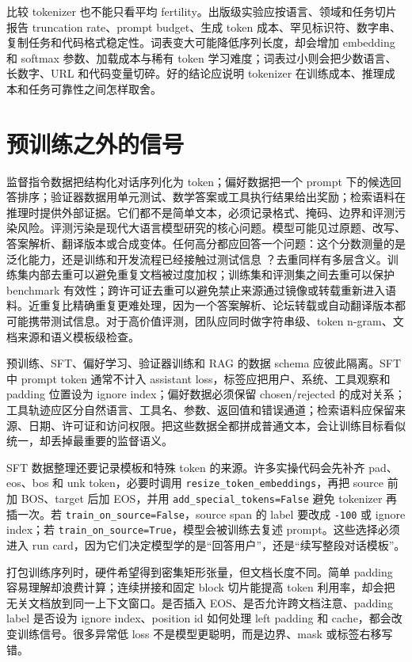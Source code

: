 \documentclass[UTF8,zihao=-4,openany]{ctexbook}
\begin{document}
比较 tokenizer 也不能只看平均 fertility。出版级实验应按语言、领域和任务切片报告 truncation rate、prompt budget、生成 token 成本、罕见标识符、数字串、复制任务和代码格式稳定性。词表变大可能降低序列长度，却会增加 embedding 和 softmax 参数、加载成本与稀有 token 学习难度；词表过小则会把少数语言、长数字、URL 和代码变量切碎。好的结论应说明 tokenizer 在训练成本、推理成本和任务可靠性之间怎样取舍。

\section{预训练之外的信号}
监督指令数据把结构化对话序列化为 token；偏好数据把一个 prompt 下的候选回答排序；验证器数据用单元测试、数学答案或工具执行结果给出奖励；检索语料在推理时提供外部证据。它们都不是简单文本，必须记录格式、掩码、边界和评测污染风险。评测污染是现代大语言模型研究的核心问题。模型可能见过原题、改写、答案解析、翻译版本或合成变体。任何高分都应回答一个问题：这个分数测量的是泛化能力，还是训练和开发流程已经接触过测试信息 \cite{xu2024benchmark}？去重同样有多层含义。训练集内部去重可以避免重复文档被过度加权；训练集和评测集之间去重可以保护 benchmark 有效性；跨许可证去重可以避免禁止来源通过镜像或转载重新进入语料。近重复比精确重复更难处理，因为一个答案解析、论坛转载或自动翻译版本都可能携带测试信息。对于高价值评测，团队应同时做字符串级、token n-gram、文档来源和语义模板级检查。

预训练、SFT、偏好学习、验证器训练和 RAG 的数据 schema 应彼此隔离。SFT 中 prompt token 通常不计入 assistant loss，标签应把用户、系统、工具观察和 padding 位置设为 ignore index；偏好数据必须保留 chosen/rejected 的成对关系；工具轨迹应区分自然语言、工具名、参数、返回值和错误通道；检索语料应保留来源、日期、许可证和访问权限。把这些数据全都拼成普通文本，会让训练目标看似统一，却丢掉最重要的监督语义。

SFT 数据整理还要记录模板和特殊 token 的来源。许多实操代码会先补齐 pad、eos、bos 和 unk token，必要时调用 \texttt{resize\_token\_embeddings}，再把 source 前加 BOS、target 后加 EOS，并用 \texttt{add\_special\_tokens=False} 避免 tokenizer 再插一次。若 \texttt{train\_on\_source=False}，source span 的 label 要改成 \texttt{-100} 或 ignore index；若 \texttt{train\_on\_source=True}，模型会被训练去复述 prompt。这些选择必须进入 run card，因为它们决定模型学的是“回答用户”，还是“续写整段对话模板”。

打包训练序列时，硬件希望得到密集矩形张量，但文档长度不同。简单 padding 容易理解却浪费计算；连续拼接和固定 block 切片能提高 token 利用率，却会把无关文档放到同一上下文窗口。是否插入 EOS、是否允许跨文档注意、padding label 是否设为 ignore index、position id 如何处理 left padding 和 cache，都会改变训练信号。很多异常低 loss 不是模型更聪明，而是边界、mask 或标签右移写错。
\end{document}
